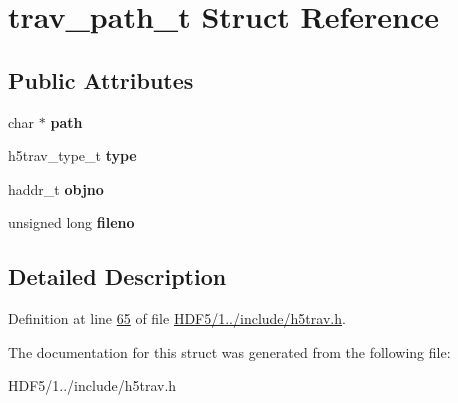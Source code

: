 \hypertarget{structtrav__path__t}{}\section{trav\+\_\+path\+\_\+t Struct Reference}
\label{structtrav__path__t}
\subsection*{Public Attributes}
\begin{DoxyCompactItemize}
\item 
\mbox{\label{structtrav__path__t_a7f2e63247ab2d83face5de0801180893}} 
char $\ast$ {\bfseries path}
\item 
\mbox{\label{structtrav__path__t_adc8c288c009a84eb87be12869cd5e1db}} 
h5trav\+\_\+type\+\_\+t {\bfseries type}
\item 
\mbox{\label{structtrav__path__t_ac73187c3bb58fcfecfeca1bc0b53656d}} 
haddr\+\_\+t {\bfseries objno}
\item 
\mbox{\label{structtrav__path__t_a48c591c39be1a40dd14931b72cd8600d}} 
unsigned long {\bfseries fileno}
\end{DoxyCompactItemize}


\subsection{Detailed Description}


Definition at line \hyperlink{_h_d_f5_21_810_81_2include_2h5trav_8h_source_l00065}{65} of file \hyperlink{_h_d_f5_21_810_81_2include_2h5trav_8h_source}{H\+D\+F5/1../include/h5trav.\+h}.



The documentation for this struct was generated from the following file\+:\begin{DoxyCompactItemize}
\item 
H\+D\+F5/1../include/h5trav.\+h\end{DoxyCompactItemize}
